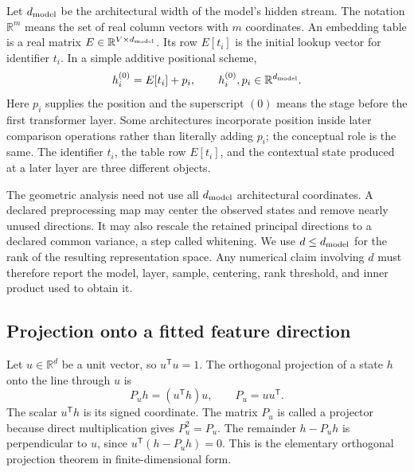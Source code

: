 \documentclass[
  aps,
  reprint,
  superscriptaddress,
  floatfix,
  nofootinbib,
  longbibliography
]{revtex4-2}
\newcommand{\R}{\mathbb{R}}
\newcommand{\T}{^{\mathsf T}}
\begin{document}
Let $d_{\rm model}$ be the architectural width of the model's hidden stream.
The notation $\R^m$ means the set of real column vectors with $m$ coordinates.
An embedding table is a real matrix
$E\in\R^{V\times d_{\rm model}}$.  Its row $E[t_i]$ is the initial lookup
vector for identifier $t_i$.  In a simple additive positional scheme,
\begin{equation}
 h_i^{(0)}=E[t_i]+p_i,
 \qquad h_i^{(0)},p_i\in\R^{d_{\rm model}}.
 \label{eq:lookup-app}
\end{equation}
Here $p_i$ supplies the position and the superscript $(0)$ means the stage
before the first transformer layer.  Some architectures incorporate position
inside later comparison operations rather than literally adding $p_i$; the
conceptual role is the same.  The identifier $t_i$, the table row $E[t_i]$, and the
contextual state produced at a later layer are three different objects.

The geometric analysis need not use all $d_{\rm model}$ architectural
coordinates.  A declared preprocessing map may center the observed states and
remove nearly unused directions.  It may also rescale the retained principal
directions to a declared common variance, a step called whitening.  We use
$d\leq d_{\rm model}$ for the rank of the resulting representation space.
Any numerical claim involving $d$ must therefore report the model,
layer, sample, centering, rank threshold, and inner product used to obtain it.

\subsection{Projection onto a fitted feature direction}

Let $u\in\R^d$ be a unit vector, so $u\T u=1$.  The orthogonal projection of a
state $h$ onto the line through $u$ is
\begin{equation}
 P_u h=(u\T h)u,
 \qquad P_u=uu\T .
 \label{eq:projection-app}
\end{equation}
The scalar $u\T h$ is its signed coordinate.  The matrix $P_u$ is called a
projector because direct multiplication gives $P_u^2=P_u$.  The remainder
$h-P_u h$ is perpendicular to $u$, since
$u\T(h-P_u h)=0$.  This is the elementary orthogonal projection theorem in
finite-dimensional form.
\end{document}

